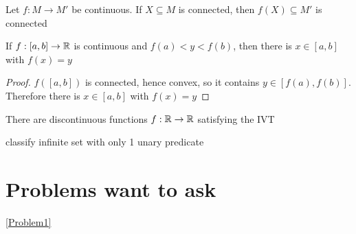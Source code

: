 \documentclass[11pt]{article}
\begin{document}
\begin{proposition}[]
Let \(f:M\to M'\) be continuous. If \(X\subseteq M\) is connected, then \(f(X)\subseteq M'\) is connected
\end{proposition}

\begin{corollary}
If \(f:[a,b]\to\mathbb{R}\) is continuous and \(f(a)<y<f(b)\), then there is \(x\in[a,b]\) with \(f(x)=y\)
\end{corollary}

\begin{proof}
\(f([a,b])\) is connected, hence convex, so it contains \(y\in[f(a),f(b)]\). Therefore there
is \(x\in[a,b]\) with \(f(x)=y\)
\end{proof}

There are discontinuous functions \(f:\mathbb{R}\to\mathbb{R}\) satisfying the IVT

classify infinite set with only 1 unary predicate

\section{Problems want to ask}
\label{sec:org67da3d5}
\ref{Problem1}
\end{document}
